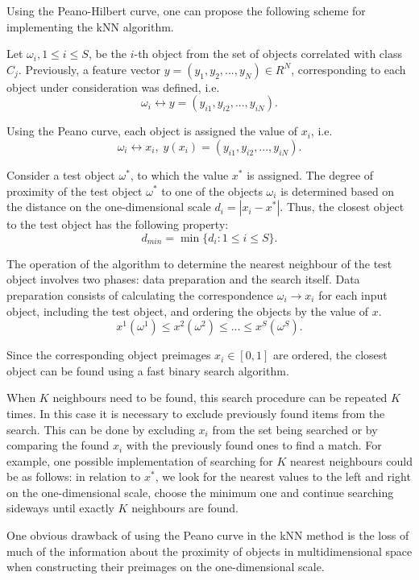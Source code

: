 \documentclass[entropy,article,submit,moreauthors,pdftex]{Definitions/mdpi}
\begin{document}
Using the Peano-Hilbert curve, one can propose the following scheme for implementing the kNN algorithm.

Let $\omega_i, 1 \leq i \leq S$, be the $i$-th object from the set of objects correlated with class $C_j$. Previously, a feature vector $y = (y_1, y_2, ..., y_N) \in R^N$, corresponding to each object under consideration was defined, i.e. 
\[
\omega_i \leftrightarrow y = (y_{i1}, y_{i2}, ..., y_{iN}).
\] 

Using the Peano curve, each object is assigned the value of $x_i$, i.e.
\[
\omega_i \leftrightarrow x_i, \; y(x_i) = (y_{i1}, y_{i2}, ..., y_{iN}).
\] 

Consider a test object $\omega^*$, to which the value $x^*$ is assigned. The degree of proximity of the test object $\omega^*$ to one of the objects $\omega_i$ is determined based on the distance on the one-dimensional scale $d_i = |x_i - x^* |$.
Thus, the closest object to the test object has the following property:
\[
d_{min} = \min \{ d_i: 1 \leq i \leq S \}.
\] 

The operation of the algorithm to determine the nearest neighbour of the test object involves two phases: data preparation and the search itself. Data preparation consists of calculating the correspondence $\omega_i \rightarrow x_i$ for each input object, including the test object, and ordering the objects by the value of $x$.
\[
x^1(\omega^1) \leq x^2(\omega^2) \leq ... \leq x^S(\omega^S).
\] 

Since the corresponding object preimages $x_i \in [0,1]$ are ordered, the closest object can be found using a fast binary search algorithm.

When $K$ neighbours need to be found, this search procedure can be repeated $K$ times. In this case it is necessary to exclude previously found items from the search. This can be done by excluding $x_i$ from the set being searched or by comparing the found $x_i$ with the previously found ones to find a match. For example, one possible implementation of searching for $K$ nearest neighbours could be as follows: in relation to $x^*$, we look for the nearest values to the left and right on the one-dimensional scale, choose the minimum one and continue searching sideways until exactly $K$ neighbours are found.

One obvious drawback of using the Peano curve in the kNN method is the loss of much of the information about the proximity of objects in multidimensional space when constructing their preimages on the one-dimensional scale. 
\end{document}
